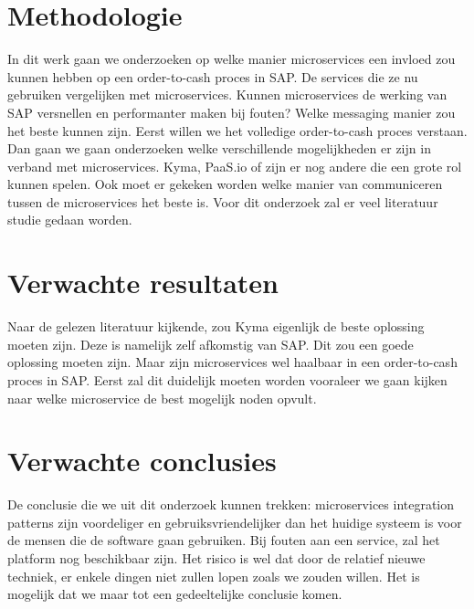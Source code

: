 
\section{Methodologie}
\label{sec:methodologie}
In dit werk gaan we onderzoeken op welke manier microservices een invloed zou kunnen hebben op een order-to-cash proces in SAP. De services die ze nu gebruiken vergelijken met microservices. Kunnen microservices de werking van SAP versnellen en performanter maken bij fouten? Welke messaging manier zou het beste kunnen zijn. 
Eerst willen we het volledige order-to-cash proces verstaan. Dan gaan we gaan onderzoeken welke verschillende mogelijkheden er zijn in verband met microservices. Kyma, PaaS.io of zijn er nog andere die een grote rol kunnen spelen. Ook moet er gekeken worden welke manier van communiceren tussen de microservices het beste is. Voor dit onderzoek zal er veel literatuur studie gedaan worden. 


\section{Verwachte resultaten}
\label{sec:verwachte_resultaten}
Naar de gelezen literatuur kijkende, zou Kyma eigenlijk de beste oplossing moeten zijn. Deze is namelijk zelf afkomstig van SAP. Dit zou een goede oplossing moeten zijn. Maar zijn microservices wel haalbaar in een order-to-cash proces in SAP. Eerst zal dit duidelijk moeten worden vooraleer we gaan kijken naar welke microservice de best mogelijk noden opvult. 


\section{Verwachte conclusies}
\label{sec:verwachte_conclusies}

De conclusie die we uit dit onderzoek  kunnen trekken: microservices integration patterns zijn voordeliger en gebruiksvriendelijker dan het huidige systeem is voor de mensen die de software gaan gebruiken. Bij fouten aan een service, zal het platform nog beschikbaar zijn. Het risico is wel dat door de relatief nieuwe techniek, er enkele dingen niet zullen lopen zoals we zouden willen. Het is mogelijk dat we maar tot een gedeeltelijke conclusie komen.

